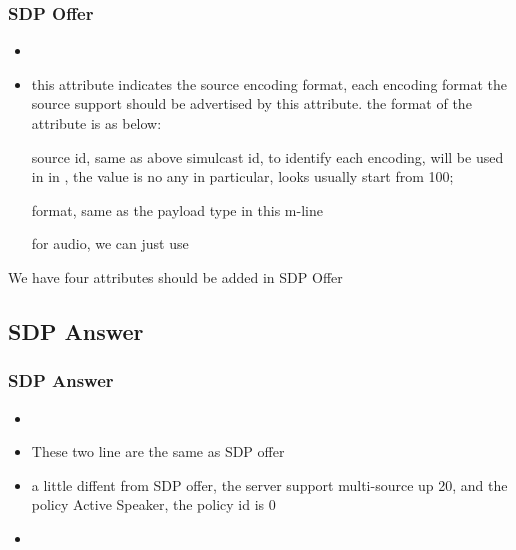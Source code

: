 \documentclass{beamer}
\begin{document}
\begin{frame}
  \frametitle{SDP Offer}
  {\small
  \begin{itemize}
    \item {}
    \item {}
      {\footnotesize 

        this attribute indicates the source encoding format, each encoding format the source support should be advertised by this attribute. the format of the attribute is as below:


        source id, same as above
        simulcast id, to identify each encoding, will be used in  in , the value is no any in particular, looks usually start from 100;

        format, same as the payload type in this m-line

        for audio, we can just use 
    }
  \end{itemize}

  We have four attributes should be added in SDP Offer 

}
\end{frame}

\subsection{SDP Answer} %

\begin{frame}
  \frametitle{SDP Answer}
  \begin{itemize}
    \setlength\itemsep{1em}
    \item {}
    \item {}

      These two line are the same as SDP offer
    \item {}

      a little diffent from SDP offer, the server support multi-source up 20, and the policy Active Speaker, the policy id is 0

    \item {}
  \end{itemize}
\end{frame}
\end{document}
